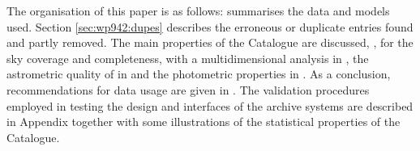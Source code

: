 \bigskip
The organisation of this paper is as follows: 
 summarises the data and models
used. Section \ref{sec:wp942:dupes} describes the erroneous or duplicate entries
found and partly removed. The main properties of the {} Catalogue are discussed, 
, for the sky coverage and completeness,
with a multidimensional analysis in , the
astrometric quality of {} in  and the
photometric properties in . As a conclusion, 
recommendations for data usage are given in .
The validation procedures employed in testing the design and interfaces 
of the archive systems are described in Appendix
together with some illustrations of the statistical properties of the Catalogue. 
 

